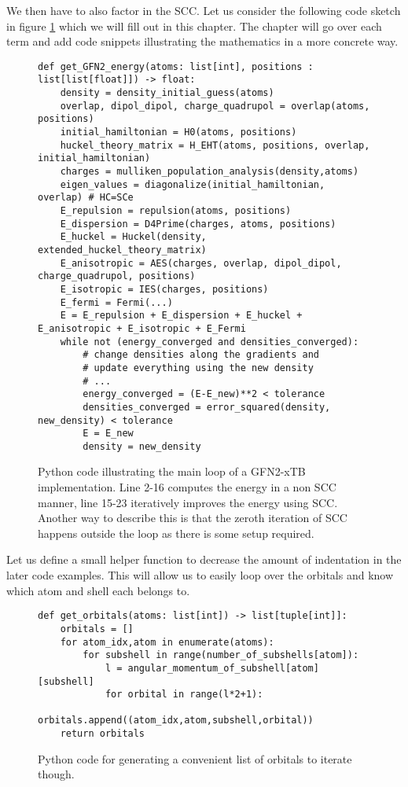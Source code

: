 We then have to also factor in the SCC. 
Let us consider the following code sketch in figure \ref{lst:total_energy} which we will fill out in this chapter. The chapter will go over each term and add code snippets illustrating the mathematics in a more concrete way. 
\begin{figure}[H]
\begin{verbatim}
def get_GFN2_energy(atoms: list[int], positions : list[list[float]]) -> float:
    density = density_initial_guess(atoms)
    overlap, dipol_dipol, charge_quadrupol = overlap(atoms, positions)
    initial_hamiltonian = H0(atoms, positions)
    huckel_theory_matrix = H_EHT(atoms, positions, overlap, initial_hamiltonian)
    charges = mulliken_population_analysis(density,atoms)
    eigen_values = diagonalize(initial_hamiltonian, overlap) # HC=SCe 
    E_repulsion = repulsion(atoms, positions)
    E_dispersion = D4Prime(charges, atoms, positions)
    E_huckel = Huckel(density, extended_huckel_theory_matrix)
    E_anisotropic = AES(charges, overlap, dipol_dipol, charge_quadrupol, positions)
    E_isotropic = IES(charges, positions)
    E_fermi = Fermi(...)
    E = E_repulsion + E_dispersion + E_huckel + E_anisotropic + E_isotropic + E_Fermi
    while not (energy_converged and densities_converged):
        # change densities along the gradients and 
        # update everything using the new density
        # ...
        energy_converged = (E-E_new)**2 < tolerance
        densities_converged = error_squared(density, new_density) < tolerance
        E = E_new
        density = new_density
\end{verbatim}
\caption{Python code illustrating the main loop of a GFN2-xTB implementation.
Line 2-16 computes the energy in a non SCC manner, line 15-23 iteratively improves the energy using SCC.
Another way to describe this is that the zeroth iteration of SCC happens outside the loop as there is some setup required. 
}
    \label{lst:total_energy}
\end{figure}
Let us define a small helper function to decrease the amount of indentation in the later code examples. This will allow us to easily loop over the orbitals and know which atom and shell each belongs to. 
\begin{figure}[H]
\begin{verbatim}
def get_orbitals(atoms: list[int]) -> list[tuple[int]]:
    orbitals = []
    for atom_idx,atom in enumerate(atoms):
        for subshell in range(number_of_subshells[atom]):
            l = angular_momentum_of_subshell[atom][subshell] 
            for orbital in range(l*2+1):
                orbitals.append((atom_idx,atom,subshell,orbital))
    return orbitals
\end{verbatim}
\caption{Python code for generating a convenient list of orbitals to iterate though. }
\end{figure}

